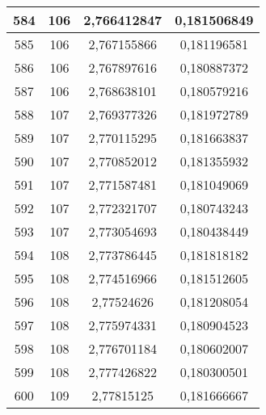 {\begin{minipage}[!h]{0.45\textwidth}
\begin{longtable}{cccc}
584 & 106 & 2,766412847 & 0,181506849 \\ \hline
585 & 106 & 2,767155866 & 0,181196581 \\ \hline
586 & 106 & 2,767897616 & 0,180887372 \\ \hline
587 & 106 & 2,768638101 & 0,180579216 \\ \hline
588 & 107 & 2,769377326 & 0,181972789 \\ \hline
589 & 107 & 2,770115295 & 0,181663837 \\ \hline
590 & 107 & 2,770852012 & 0,181355932 \\ \hline
591 & 107 & 2,771587481 & 0,181049069 \\ \hline
592 & 107 & 2,772321707 & 0,180743243 \\ \hline
593 & 107 & 2,773054693 & 0,180438449 \\ \hline
594 & 108 & 2,773786445 & 0,181818182 \\ \hline
595 & 108 & 2,774516966 & 0,181512605 \\ \hline
596 & 108 & 2,77524626 & 0,181208054 \\ \hline
597 & 108 & 2,775974331 & 0,180904523 \\ \hline
598 & 108 & 2,776701184 & 0,180602007 \\ \hline
599 & 108 & 2,777426822 & 0,180300501 \\ \hline
600 & 109 & 2,77815125 & 0,181666667 \\ \hline
\end{longtable}
\end{minipage}

}
